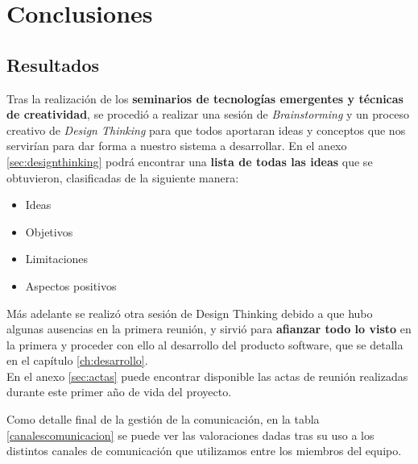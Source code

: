 \chapter{Conclusiones}
\label{ch:conclusiones}






\section{Resultados}
Tras la realización de los \textbf{seminarios de tecnologías emergentes y técnicas de creatividad}, se procedió a realizar una sesión de \textit{Brainstorming} y un proceso creativo de \textit{Design Thinking} para que todos aportaran ideas y conceptos que nos servirían para dar forma a nuestro sistema a desarrollar. En el anexo \ref{sec:designthinking} podrá encontrar una \textbf{lista de todas las ideas} que se obtuvieron, clasificadas de la siguiente manera:

\begin{itemize}
    \item Ideas
    \item Objetivos
    \item Limitaciones
    \item Aspectos positivos
\end{itemize}

Más adelante se realizó otra sesión de Design Thinking debido a que hubo algunas ausencias en la primera reunión, y sirvió para \textbf{afianzar todo lo visto} en la primera y proceder con ello al desarrollo del producto software, que se detalla en el capítulo \ref{ch:desarrollo}.\\

En el anexo \ref{sec:actas} puede encontrar disponible las actas de reunión realizadas durante este primer año de vida del proyecto.

















Como detalle final de la gestión de la comunicación, en la tabla \ref{canalescomunicacion} se puede ver las valoraciones dadas tras su uso a los distintos canales de comunicación que utilizamos entre los miembros del equipo.

